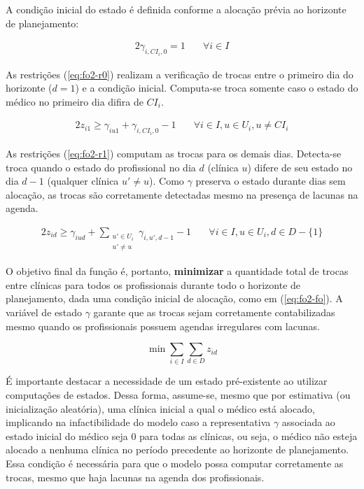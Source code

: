 A condição inicial do estado é definida conforme a alocação prévia ao horizonte de planejamento:

\begin{alignat}{2}
	\gamma_{i,CI_i,0} = 1 \quad & \forall i \in I \label{eq:gamma-init}
\end{alignat}

As restrições (\ref{eq:fo2-r0}) realizam a verificação de trocas entre o primeiro dia do horizonte ($d=1$) e a condição inicial. Computa-se troca somente caso o estado do médico no primeiro dia difira de $CI_i$.

\begin{alignat}{2}
	z_{i1} \geq \gamma_{iu1} + \gamma_{i,CI_i,0} - 1 \quad & \forall i \in I, u \in U_i, u \neq CI_i \label{eq:fo2-r0}
\end{alignat}

As restrições (\ref{eq:fo2-r1}) computam as trocas para os demais dias. Detecta-se troca quando o estado do profissional no dia $d$ (clínica $u$) difere de seu estado no dia $d-1$ (qualquer clínica $u' \neq u$). Como $\gamma$ preserva o estado durante dias sem alocação, as trocas são corretamente detectadas mesmo na presença de lacunas na agenda.

\begin{alignat}{2}
	z_{id} \geq \gamma_{iud} + \sum_{\substack{u' \in U_i \\ u' \neq u}} \gamma_{i,u',d-1} - 1 \quad & \forall i \in I, u \in U_i, d \in D - \{1\} \label{eq:fo2-r1}
\end{alignat}

O objetivo final da função é, portanto, \textbf{minimizar} a quantidade total de trocas entre clínicas para todos os profissionais durante todo o horizonte de planejamento, dada uma condição inicial de alocação, como em (\ref{eq:fo2-fo}). A variável de estado $\gamma$ garante que as trocas sejam corretamente contabilizadas mesmo quando os profissionais possuem agendas irregulares com lacunas.

\begin{equation}
	\min \sum_{i \in I}\sum_{d \in D} z_{id} \label{eq:fo2-fo}
\end{equation}

É importante destacar a necessidade de um estado pré-existente ao utilizar computações de estados. Dessa forma, assume-se, mesmo que por estimativa (ou inicialização aleatória), uma clínica inicial a qual o médico está alocado, implicando na infactibilidade do modelo caso a representativa $\gamma$ associada ao estado inicial do médico seja $0$ para todas as clínicas, ou seja, o médico não esteja alocado a nenhuma clínica no período precedente ao horizonte de planejamento. Essa condição é necessária para que o modelo possa computar corretamente as trocas, mesmo que haja lacunas na agenda dos profissionais.
